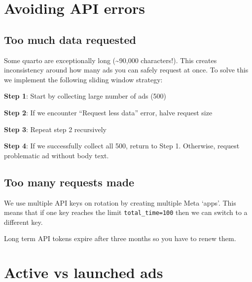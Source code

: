 \documentclass[
  letterpaper,
  DIV=11,
  numbers=noendperiod]{scrreprt}
\begin{document}
\section{Avoiding API errors}\label{avoiding-api-errors}

\subsection{Too much data requested}\label{too-much-data-requested}

Some quarto are exceptionally long (\textasciitilde90,000 characters!).
This creates inconsistency around how many ads you can safely request at
once. To solve this we implement the following sliding window strategy:

\textbf{Step 1}: Start by collecting large number of ads (500)

\textbf{Step 2}: If we encounter ``Request less data'' error, halve
request size

\textbf{Step 3}: Repeat step 2 recursively

\textbf{Step 4}: If we successfully collect all 500, return to Step 1.
Otherwise, request problematic ad without body text.

\subsection{Too many requests made}\label{too-many-requests-made}

We use multiple API keys on rotation by creating multiple Meta `apps'.
This means that if one key reaches the limit \texttt{total\_time=100}
then we can switch to a different key.

\begin{tcolorbox}[enhanced jigsaw, breakable, colback=white, opacityback=0, bottomrule=.15mm, coltitle=black, bottomtitle=1mm, rightrule=.15mm, titlerule=0mm, colframe=quarto-callout-tip-color-frame, left=2mm, colbacktitle=quarto-callout-tip-color!10!white, opacitybacktitle=0.6, toptitle=1mm, title=\textcolor{quarto-callout-tip-color}{\faLightbulb}\hspace{0.5em}{Renewing API access}, arc=.35mm, leftrule=.75mm, toprule=.15mm]

Long term API tokens expire after three months so you have to renew
them.

\end{tcolorbox}

\section{Active vs launched ads}\label{active-vs-launched-ads}
\end{document}
